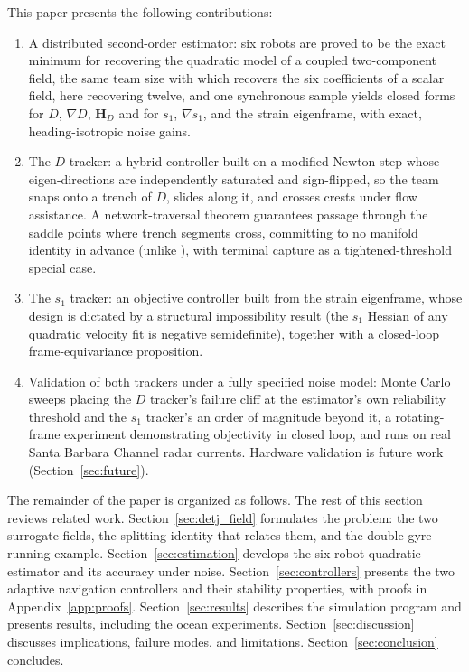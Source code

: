 \documentclass[lettersize,journal]{IEEEtran}
\begin{document}
This paper presents the following contributions:
\begin{enumerate}
    \item A distributed second-order estimator: six robots are proved
          to be the exact minimum for recovering the quadratic model of
          a coupled two-component field, the same team size with which
          \cite{15} recovers the six coefficients of a scalar field,
          here recovering twelve, and one synchronous sample yields
          closed forms for $D$, $\nabla D$, $\mathbf{H}_D$ and for
          $s_1$, $\nabla s_1$, and the strain eigenframe, with exact,
          heading-isotropic noise gains.
    \item The $D$ tracker: a hybrid controller built on a
          modified Newton step whose eigen-directions are independently
          saturated and sign-flipped, so the team snaps onto a trench
          of $D$, slides along it, and crosses crests under flow
          assistance. A network-traversal theorem guarantees passage
          through the saddle points where trench segments cross,
          committing to no manifold identity in advance (unlike
          \cite{9,10}), with terminal capture as a tightened-threshold
          special case.
    \item The $s_1$ tracker: an objective controller built from the
          strain eigenframe, whose design is dictated by a structural
          impossibility result (the $s_1$ Hessian of any quadratic
          velocity fit is negative semidefinite), together with a
          closed-loop frame-equivariance proposition.
    \item Validation of both trackers under a fully specified noise
          model: Monte Carlo sweeps placing the $D$ tracker's failure
          cliff at the estimator's own reliability threshold and the
          $s_1$ tracker's an order of magnitude beyond it, a rotating-frame
          experiment demonstrating objectivity in closed loop, and runs
          on real Santa Barbara Channel radar currents. Hardware
          validation is future work (Section~\ref{sec:future}).
\end{enumerate}

The remainder of the paper is organized as follows. The rest of this
section reviews related work. Section~\ref{sec:detj_field} formulates
the problem: the two surrogate fields, the splitting identity that
relates them, and the double-gyre running example.
Section~\ref{sec:estimation} develops the six-robot quadratic estimator
and its accuracy under noise. Section~\ref{sec:controllers} presents
the two adaptive navigation controllers and their stability properties,
with proofs in Appendix~\ref{app:proofs}. Section~\ref{sec:results}
describes the simulation program and presents results, including the
ocean experiments. Section~\ref{sec:discussion} discusses implications,
failure modes, and limitations. Section~\ref{sec:conclusion} concludes.
\end{document}
